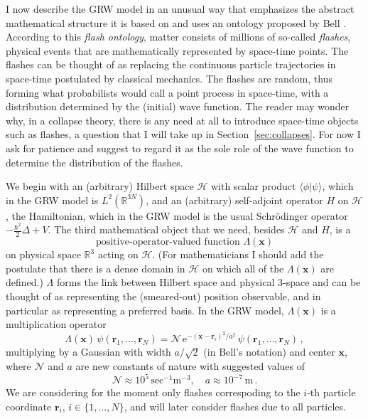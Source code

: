 \documentclass[12pt]{article}
\newcommand{\RRR}{\mathbb{R}}
\newcommand{\Hilbert}{\mathscr{H}}
\renewcommand{\sp}[2]{\langle #1 | #2 \rangle}
\newcommand{\vx}{\boldsymbol{x}}
\newcommand{\vr}{\boldsymbol{r}}
\newcommand{\E}{\mathrm{e}} %
\newcommand{\1}{1}
\newcommand{\nconst}{\mathcal{N}}
\newcommand{\z}[1]{{#1}}
\begin{document}
I now describe the GRW model in an unusual way that emphasizes the abstract mathematical structure it is based on and uses an ontology proposed by Bell \cite{Belljumps,Bellexact}. According to this \emph{flash ontology}, matter consists of millions of so-called \emph{flashes}, physical events that are mathematically represented by space-time points. The flashes can be thought of as replacing the continuous particle trajectories in space-time postulated by classical mechanics. The flashes are random, thus forming what probabilists would call a point process in space-time, with a distribution determined by the (initial) wave function. The reader may wonder why, in a collapse theory, there is any need at all to introduce space-time objects such as flashes, a question that I will take up in Section~\ref{sec:collapses}. For now I ask for patience and suggest to regard it as the sole role of the wave function to determine the distribution of the flashes.

We begin with an (arbitrary) Hilbert space $\Hilbert$ with scalar product $\sp{\phi}{\psi}$, which in the GRW model is $L^2(\RRR^{3N})$, and an (arbitrary) self-adjoint operator $H$ on $\Hilbert$, the Hamiltonian, which in the GRW model is the usual Schr\"odinger operator $-\tfrac{\hbar^2}{2} \Delta +V$.  The third mathematical object that we need, besides $\Hilbert$ and $H$, is a 
\begin{equation}
  \text{positive-operator-valued function }\Lambda(\vx) 
\end{equation}
on physical space $\RRR^3$ acting on $\Hilbert$. (For mathematicians I should add the postulate that there is a dense domain in $\Hilbert$ on which all of the $\Lambda(\vx)$ are defined.) $\Lambda$ forms the link between Hilbert space and physical 3-space and can be thought of as representing the (smeared-out) position observable, and in particular as representing a preferred basis. In the GRW model, $\Lambda(\vx)$ is a multiplication operator
\begin{equation}\label{LambdaGRW}
  \Lambda(\vx) \, \psi(\vr_1, \ldots, \vr_N) = \nconst \, 
  \E^{-(\vx - \vr_i)^2/a^2} \, \psi(\vr_1, \ldots, \vr_N) \,,
\end{equation}
multiplying by a Gaussian with width $a/\sqrt{2}$ (in Bell's \cite{Belljumps} notation) \z{and center $\vx$, where $\nconst$ and $a$ are new constants of nature with suggested values of} 
\begin{equation}
  \nconst \approx 10^5\, \mathrm{sec}^{-1}\mathrm{m}^{-3}, \quad 
  a \approx 10^{-7} \, \mathrm{m} \,.
\end{equation}
\z{We are considering for the moment only flashes correspoding to the $i$-th particle coordinate $\vr_i$, $i \in \{1,\ldots,N\}$, and will later consider flashes due to all particles.}
\end{document}
